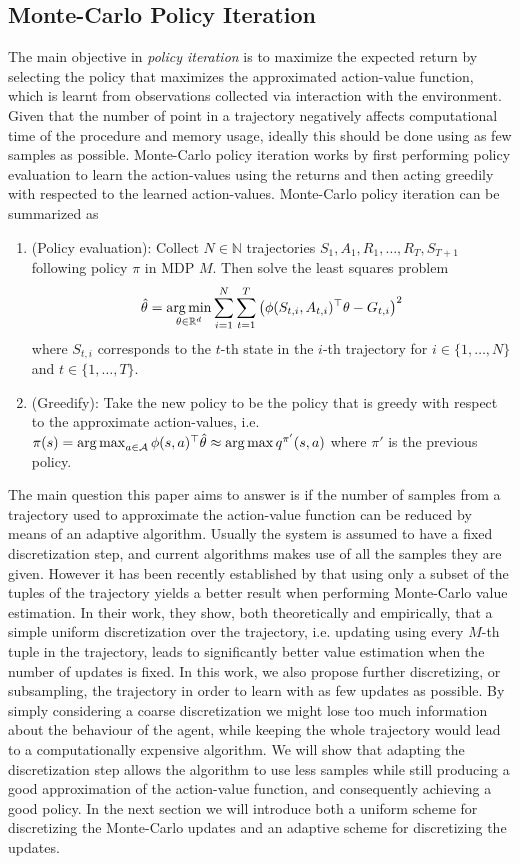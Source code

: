 \subsection{Monte-Carlo Policy Iteration} The main objective in \textit{policy iteration} is to maximize the expected return by selecting the policy that maximizes the approximated action-value function, which is learnt from observations collected via interaction with the environment. Given that the number of point in a trajectory negatively affects computational time of the procedure and memory usage, ideally this should be done using as few samples as possible. Monte-Carlo policy iteration works by first performing policy evaluation to learn the action-values using the returns and then acting greedily with respected to the learned action-values. Monte-Carlo policy iteration can be summarized as 
\begin{enumerate}
    \item (Policy evaluation): Collect $N \in \mathbb{N}$ trajectories $S_{1},A_1,R_1,\dotsc,R_T,S_{T+1}$ following policy $\pi$ in MDP $M$. Then solve the least squares problem 
    \begin{align*}
        \hat\theta = \mathop{\rm arg\,min}_{\theta \in \mathbb{R}^d} \sum_{i=1}^N\sum_{t=1}^T \left(\phi(S_{t,i},A_{t,i})^\top \theta - G_{t,i}\right)^2
    \end{align*}
    where $S_{t,i}$ corresponds to the $t$-th state in the $i$-th trajectory for $i \in \{1,\dotsc,N\}$ and $t \in \{1,\dotsc,T\}$.
    \item (Greedify): Take the new policy to be the policy that is greedy with respect to the approximate action-values, i.e. $\pi(s) = \mathop{\rm arg\,max}_{a \in \mathcal{A}} \phi(s,a)^\top \hat\theta \approx \mathop{\rm arg\,max} q^{\pi'}(s,a)$ where $\pi'$ is the previous policy.
\end{enumerate}
The main question this paper aims to answer is if the number of samples from a trajectory used to approximate the action-value function can be reduced by means of an adaptive algorithm. Usually the system is assumed to have a fixed discretization step, and current algorithms makes use of all the samples they are given. However it has been recently established by \cite{zhang2024managing} that using only a subset of the tuples of the trajectory yields a better result when performing Monte-Carlo value estimation. In their work, they show, both theoretically and empirically, that a simple uniform discretization over the trajectory, i.e. updating using every $M$-th tuple in the trajectory, leads to significantly better value estimation when the number of updates is fixed. In this work, we also propose further discretizing, or subsampling, the trajectory in order to learn with as few updates as possible. By simply considering a coarse discretization we might lose too much information about the behaviour of the agent, while keeping the whole trajectory would lead to a computationally expensive algorithm. We will show that adapting the discretization step allows the algorithm to use less samples while still producing a good approximation of the action-value function, and consequently achieving a good policy. In the next section we will introduce both a uniform scheme for discretizing the Monte-Carlo updates and an adaptive scheme for discretizing the updates.



